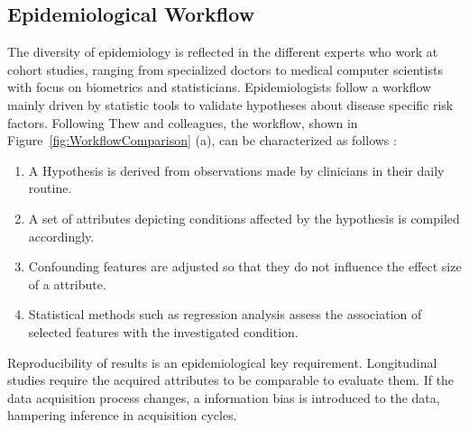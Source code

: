 \documentclass[journal]{style/vgtc} 			          %
\begin{document}
\subsection{Epidemiological Workflow} \label{EpidemiologicalWorkflow}
The diversity of epidemiology is reflected in the different experts who work at cohort studies, ranging from specialized doctors to medical computer scientists with focus on biometrics and statisticians.
%
Epidemiologists follow a workflow mainly driven by statistic tools to validate hypotheses about disease specific risk factors.
%
Following Thew and colleagues, the workflow, shown in Figure~\ref{fig:WorkflowComparison} (a), can be characterized as follows \cite{Thew2009}:
%
\begin{enumerate}
	\item A Hypothesis is derived from observations made by clinicians in their daily routine.
%
	\item A set of attributes depicting conditions affected by the hypothesis is compiled accordingly.
	\item Confounding features are adjusted so that they do not influence the effect size of a attribute.
%
	\item Statistical methods such as regression analysis assess the association of selected features with the investigated condition.%
\end{enumerate}

Reproducibility of results is an epidemiological key requirement.
%
Longitudinal studies require the acquired attributes to be comparable to evaluate them.
%
If the data acquisition process changes, a information bias is introduced to the data, hampering inference in acquisition cycles.
%
\end{document}
